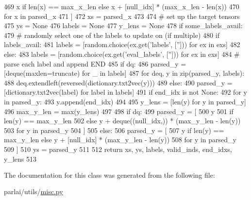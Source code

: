 \begin{DoxyCode}
469                 x \textcolor{keywordflow}{if} len(x) == max\_x\_len \textcolor{keywordflow}{else} x + [null\_idx] * (max\_x\_len - len(x))
470                 \textcolor{keywordflow}{for} x \textcolor{keywordflow}{in} parsed\_x
471             ]
472         xs = parsed\_x
473 
474         \textcolor{comment}{# set up the target tensors}
475         ys = \textcolor{keywordtype}{None}
476         labels = \textcolor{keywordtype}{None}
477         y\_lens = \textcolor{keywordtype}{None}
478         \textcolor{keywordflow}{if} some\_labels\_avail:
479             \textcolor{comment}{# randomly select one of the labels to update on (if multiple)}
480             \textcolor{keywordflow}{if} labels\_avail:
481                 labels = [random.choice(ex.get(\textcolor{stringliteral}{'labels'}, [\textcolor{stringliteral}{''}])) \textcolor{keywordflow}{for} ex \textcolor{keywordflow}{in} exs]
482             \textcolor{keywordflow}{else}:
483                 labels = [random.choice(ex.get(\textcolor{stringliteral}{'eval\_labels'}, [\textcolor{stringliteral}{''}])) \textcolor{keywordflow}{for} ex \textcolor{keywordflow}{in} exs]
484             \textcolor{comment}{# parse each label and append END}
485             \textcolor{keywordflow}{if} dq:
486                 parsed\_y = [deque(maxlen=truncate) \textcolor{keywordflow}{for} \_ \textcolor{keywordflow}{in} labels]
487                 \textcolor{keywordflow}{for} deq, y \textcolor{keywordflow}{in} zip(parsed\_y, labels):
488                     deq.extendleft(reversed(dictionary.txt2vec(y)))
489             \textcolor{keywordflow}{else}:
490                 parsed\_y = [dictionary.txt2vec(label) \textcolor{keywordflow}{for} label \textcolor{keywordflow}{in} labels]
491             \textcolor{keywordflow}{if} end\_idx \textcolor{keywordflow}{is} \textcolor{keywordflow}{not} \textcolor{keywordtype}{None}:
492                 \textcolor{keywordflow}{for} y \textcolor{keywordflow}{in} parsed\_y:
493                     y.append(end\_idx)
494 
495             y\_lens = [len(y) \textcolor{keywordflow}{for} y \textcolor{keywordflow}{in} parsed\_y]
496             max\_y\_len = max(y\_lens)
497 
498             \textcolor{keywordflow}{if} dq:
499                 parsed\_y = [
500                     y
501                     \textcolor{keywordflow}{if} len(y) == max\_y\_len
502                     \textcolor{keywordflow}{else} y + deque((null\_idx,)) * (max\_y\_len - len(y))
503                     \textcolor{keywordflow}{for} y \textcolor{keywordflow}{in} parsed\_y
504                 ]
505             \textcolor{keywordflow}{else}:
506                 parsed\_y = [
507                     y \textcolor{keywordflow}{if} len(y) == max\_y\_len \textcolor{keywordflow}{else} y + [null\_idx] * (max\_y\_len - len(y))
508                     \textcolor{keywordflow}{for} y \textcolor{keywordflow}{in} parsed\_y
509                 ]
510             ys = parsed\_y
511 
512         \textcolor{keywordflow}{return} xs, ys, labels, valid\_inds, end\_idxs, y\_lens
513 
\end{DoxyCode}


The documentation for this class was generated from the following file\+:\begin{DoxyCompactItemize}
\item 
parlai/utils/\hyperlink{misc_8py}{misc.\+py}\end{DoxyCompactItemize}
